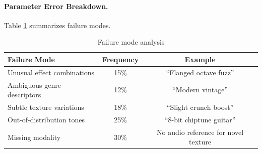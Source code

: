 \paragraph{Parameter Error Breakdown.} Table \ref{tab:failure_analysis} summarizes failure modes.

\begin{table}[h]
	\centering
	\caption{Failure mode analysis}
	\label{tab:failure_analysis}
	\small
	\begin{tabular}{lcc}
		\toprule
		\textbf{Failure Mode}       & \textbf{Frequency} & \textbf{Example}                     \\
		\midrule
		Unusual effect combinations & 15\%               & ``Flanged octave fuzz''              \\
		Ambiguous genre descriptors & 12\%               & ``Modern vintage''                   \\
		Subtle texture variations   & 18\%               & ``Slight crunch boost''              \\
		Out-of-distribution tones   & 25\%               & ``8-bit chiptune guitar''            \\
		Missing modality            & 30\%               & No audio reference for novel texture \\
		\bottomrule
	\end{tabular}
\end{table}
